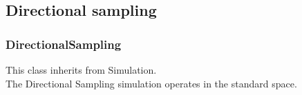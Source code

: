 \newpage
\subsection{Directional sampling}

\subsubsection{DirectionalSampling}

This class inherits from Simulation.\\

The Directional Sampling simulation operates in the standard space.

